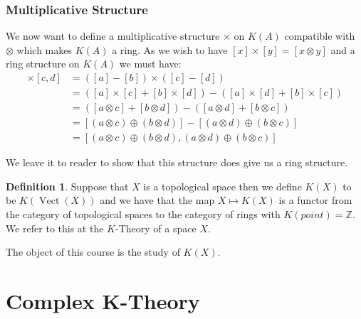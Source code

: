 \documentclass[a4paper,10pt]{article}
\theoremstyle{plain}%
\theoremstyle{definition}
\newtheorem{defn}{Definition}
\theoremstyle{remark}
\newcommand{\ZZ}{\mathbb{Z}}
\DeclareMathOperator{\Vect}{Vect}
\begin{document}
\subsubsection{Multiplicative Structure}

We now want to define a multiplicative structure $\times$ on $K(A)$ compatible with $\otimes$ which makes $K(A)$
a ring. As we wish to have $[x]\times[y]=[x\otimes y]$ and a ring structure on $K(A)$ we must have:
\begin{align*}
 [a,b]\times[c,d] &= ([a]-[b])\times([c]-[d])\\
		  &= ([a]\times[c]+[b]\times[d])-([a]\times[d]+[b]\times[c])\\
		  &= ([a\otimes c]+[b\otimes d])-([a\otimes d]+[b\otimes c])\\
		  &= [(a\otimes c)\oplus(b\otimes d)]-[(a\otimes d)\oplus(b\otimes c)]\\
		  &= [(a\otimes c)\oplus(b\otimes d),(a\otimes d)\oplus(b\otimes c)]
\end{align*}

We leave it to reader to show that this structure does give us a ring structure.

\begin{defn}
 Suppose that $X$ is a topological space then we define $K(X)$ to be $K(\Vect(X))$ and we have that the map $X\mapsto K(X)$
is a functor from the category of topological spaces to the category of rings with $K(point)=\ZZ$. We refer to this at the $K$-Theory of a space $X$.
\end{defn}

The object of this course is the study of $K(X)$.


\section{Complex K-Theory}
\end{document}
